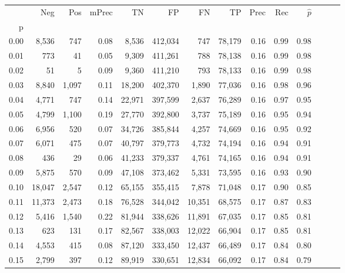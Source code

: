 \begin{tabular}{rrrrrrrrrrrrrr}
\toprule
{} &     Neg &    Pos & mPrec &       TN &       FP &      FN &      TP &  Prec &   Rec & $\hat{p}$ \\
p    &         &        &       &          &          &         &         &       &       &           \\
\midrule
0.00 &   8,536 &    747 &  0.08 &    8,536 &  412,034 &     747 &  78,179 &  0.16 &  0.99 &      0.98 \\
0.01 &     773 &     41 &  0.05 &    9,309 &  411,261 &     788 &  78,138 &  0.16 &  0.99 &      0.98 \\
0.02 &      51 &      5 &  0.09 &    9,360 &  411,210 &     793 &  78,133 &  0.16 &  0.99 &      0.98 \\
0.03 &   8,840 &  1,097 &  0.11 &   18,200 &  402,370 &   1,890 &  77,036 &  0.16 &  0.98 &      0.96 \\
0.04 &   4,771 &    747 &  0.14 &   22,971 &  397,599 &   2,637 &  76,289 &  0.16 &  0.97 &      0.95 \\
0.05 &   4,799 &  1,100 &  0.19 &   27,770 &  392,800 &   3,737 &  75,189 &  0.16 &  0.95 &      0.94 \\
0.06 &   6,956 &    520 &  0.07 &   34,726 &  385,844 &   4,257 &  74,669 &  0.16 &  0.95 &      0.92 \\
0.07 &   6,071 &    475 &  0.07 &   40,797 &  379,773 &   4,732 &  74,194 &  0.16 &  0.94 &      0.91 \\
0.08 &     436 &     29 &  0.06 &   41,233 &  379,337 &   4,761 &  74,165 &  0.16 &  0.94 &      0.91 \\
0.09 &   5,875 &    570 &  0.09 &   47,108 &  373,462 &   5,331 &  73,595 &  0.16 &  0.93 &      0.90 \\
0.10 &  18,047 &  2,547 &  0.12 &   65,155 &  355,415 &   7,878 &  71,048 &  0.17 &  0.90 &      0.85 \\
0.11 &  11,373 &  2,473 &  0.18 &   76,528 &  344,042 &  10,351 &  68,575 &  0.17 &  0.87 &      0.83 \\
0.12 &   5,416 &  1,540 &  0.22 &   81,944 &  338,626 &  11,891 &  67,035 &  0.17 &  0.85 &      0.81 \\
0.13 &     623 &    131 &  0.17 &   82,567 &  338,003 &  12,022 &  66,904 &  0.17 &  0.85 &      0.81 \\
0.14 &   4,553 &    415 &  0.08 &   87,120 &  333,450 &  12,437 &  66,489 &  0.17 &  0.84 &      0.80 \\
0.15 &   2,799 &    397 &  0.12 &   89,919 &  330,651 &  12,834 &  66,092 &  0.17 &  0.84 &      0.79 \\

\end{tabular}
